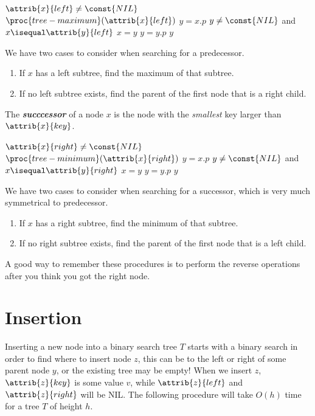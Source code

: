 \documentclass[12pt]{article}
\begin{document}
\begin{codebox}
\li \If $\attrib{x}{left} \neq \const{NIL}$
\li \Then
        \Return $\proc{tree-maximum}(\attrib{x}{left})$
    \End
\li $y = x.p$
\li \While $y \neq \const{NIL}$ and $x \isequal \attrib{y}{left}$
    \Do
        \li $x = y$ 
        \li $y = y.p$
    \End
\li \Return $y$
\end{codebox}

We have two cases to consider when searching for a predecessor.

\begin{enumerate}
    \item If $x$ has a left subtree, find the maximum of that subtree.
    \item If no left subtree exists, find the parent of the first node that is a right child.
\end{enumerate}

The \textbf{\emph{succcessor}} of a node $x$ is the node with the \textit{smallest} key larger than $\attrib{x}{key}$. 

\begin{codebox}
\li \If $\attrib{x}{right} \neq \const{NIL}$
\li \Then
        \Return $\proc{tree-minimum}(\attrib{x}{right})$
    \End
\li $y = x.p$
\li \While $y \neq \const{NIL}$ and $x \isequal \attrib{y}{right}$
    \Do
        \li $x = y$ 
        \li $y = y.p$
    \End
\li \Return $y$
\end{codebox}

We have two cases to consider when searching for a successor, which is very much symmetrical to predecessor.

\begin{enumerate}
    \item If $x$ has a right subtree, find the minimum of that subtree.
    \item If no right subtree exists, find the parent of the first node that is a left child.
\end{enumerate}

A good way to remember these procedures is to perform the reverse operations after you think you got the right node.

\newpage

\section*{Insertion}
Inserting a new node into a binary search tree $T$ starts with a binary search in order to find where to insert node $z$, this can be to the left or right of some parent node $y$, or the existing tree may be empty! When we insert $z$, $\attrib{z}{key}$ is some value $v$, while $\attrib{z}{left}$ and $\attrib{z}{right}$ will be NIL. The following procedure will take $O(h)$ time for a tree $T$ of height $h$.
\end{document}
